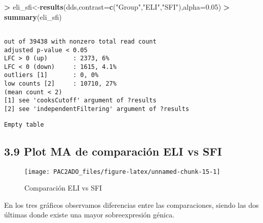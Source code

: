 \documentclass[
]{article}
\newenvironment{Shaded}{\begin{snugshade}}{\end{snugshade}}
\newcommand{\DataTypeTok}[1]{\textcolor[rgb]{0.13,0.29,0.53}{#1}}
\newcommand{\FloatTok}[1]{\textcolor[rgb]{0.00,0.00,0.81}{#1}}
\newcommand{\KeywordTok}[1]{\textcolor[rgb]{0.13,0.29,0.53}{\textbf{#1}}}
\newcommand{\NormalTok}[1]{#1}
\newcommand{\OperatorTok}[1]{\textcolor[rgb]{0.81,0.36,0.00}{\textbf{#1}}}
\newcommand{\StringTok}[1]{\textcolor[rgb]{0.31,0.60,0.02}{#1}}
\begin{document}
\begin{Shaded}
\begin{Highlighting}[]
\OperatorTok{>}\StringTok{ }\NormalTok{eli_sfi<-}\KeywordTok{results}\NormalTok{(dds,}\DataTypeTok{contrast=}\KeywordTok{c}\NormalTok{(}\StringTok{"Group"}\NormalTok{,}\StringTok{"ELI"}\NormalTok{,}\StringTok{"SFI"}\NormalTok{),}\DataTypeTok{alpha=}\FloatTok{0.05}\NormalTok{)}
\OperatorTok{>}\StringTok{ }\KeywordTok{summary}\NormalTok{(eli_sfi)}
\end{Highlighting}
\end{Shaded}

\begin{verbatim}

out of 39438 with nonzero total read count
adjusted p-value < 0.05
LFC > 0 (up)       : 2373, 6%
LFC < 0 (down)     : 1615, 4.1%
outliers [1]       : 0, 0%
low counts [2]     : 10710, 27%
(mean count < 2)
[1] see 'cooksCutoff' argument of ?results
[2] see 'independentFiltering' argument of ?results
\end{verbatim}

\begin{Shaded}
\end{Shaded}

\begin{verbatim}
Empty table
\end{verbatim}

\hypertarget{plot-ma-de-comparaciuxf3n-eli-vs-sfi}{%
\subsection{3.9 Plot MA de comparación ELI vs
SFI}\label{plot-ma-de-comparaciuxf3n-eli-vs-sfi}}

\begin{figure}

{\centering \texttt{[image: PAC2ADO\_files/figure-latex/unnamed-chunk-15-1]} 

}

\caption{Comparación ELI vs SFI}\label{fig:unnamed-chunk-15}
\end{figure}

En los tres gráficos observamos diferencias entre las comparaciones,
siendo las dos últimas donde existe una mayor sobreexpresión génica.
\end{document}
